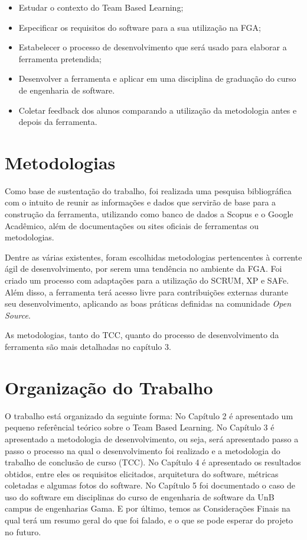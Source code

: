 \begin{itemize}
  \item Estudar o contexto do Team Based Learning;
  \item Especificar os requisitos do software para a sua utilização na FGA;
  \item Estabelecer o processo de desenvolvimento que será usado para elaborar a ferramenta pretendida;
  \item Desenvolver a ferramenta e aplicar em uma disciplina de graduação do curso de engenharia de software.
  \item Coletar feedback dos alunos comparando a utilização da metodologia antes e depois da ferramenta.
\end{itemize}

\section{Metodologias}

Como base de sustentação do trabalho, foi realizada uma pesquisa bibliográfica com o intuito de reunir as informações e dados que servirão de base para a construção da ferramenta, utilizando como banco de dados a Scopus e o Google Acadêmico, além de documentações ou sites oficiais de ferramentas ou metodologias.

Dentre as várias existentes, foram escolhidas metodologias pertencentes à corrente ágil de desenvolvimento, por serem uma tendência no ambiente da FGA. Foi criado um processo com adaptações para a utilização do SCRUM, XP e SAFe. Além disso, a ferramenta terá acesso livre para contribuições externas durante seu desenvolvimento, aplicando as boas práticas definidas na comunidade \textit{Open Source}.

As metodologias, tanto do TCC, quanto do processo de desenvolvimento da ferramenta são mais detalhadas no capítulo 3.

\section{Organização do Trabalho}

O trabalho está organizado da seguinte forma: No Capítulo 2 é apresentado um pequeno referêncial teórico sobre o Team
Based Learning. No Capítulo 3 é apresentado a metodologia de desenvolvimento, ou seja, será apresentado passo a passo o
processo na qual o desenvolvimento foi realizado e a metodologia do trabalho de conclusão de curso (TCC). No Capítulo 4
é apresentado os resultados obtidos, entre eles os requisitos elicitados, arquitetura do software, métricas coletadas e
algumas fotos do software. No Capítulo 5 foi documentado o caso de uso do software em disciplinas do curso de engenharia
de software da UnB campus de engenharias Gama. E por último, temos as Considerações Finais na qual terá um resumo geral
do que foi falado, e o que se pode esperar do projeto no futuro.
